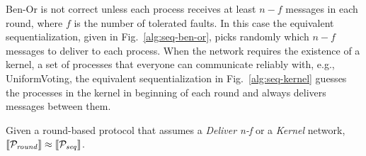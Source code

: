 Ben-Or is not correct unless each process receives at least $n-f$ messages in each round, where $f$ is the number of tolerated faults.
In this case the equivalent sequentialization, given in  Fig.~\ref{alg:seq-ben-or}, picks randomly which $n-f$ messages to deliver to each process. 
When the network requires the existence of a kernel, a set of processes that everyone can communicate reliably with, e.g., UniformVoting, the equivalent sequentialization in Fig.~\ref{alg:seq-kernel} guesses the processes in the kernel in beginning of each round and always delivers messages between them. 

\begin{proposition}
Given a round-based protocol that assumes a \textit{Deliver n-f} or a \textit{Kernel} network, $\llbracket \mathcal{P}_{\mathit{round}} \rrbracket \approx \llbracket \mathcal{P}_{\mathit{seq}} \rrbracket$.
\label{propo:sync:equiv:seq:network}
\end{proposition}